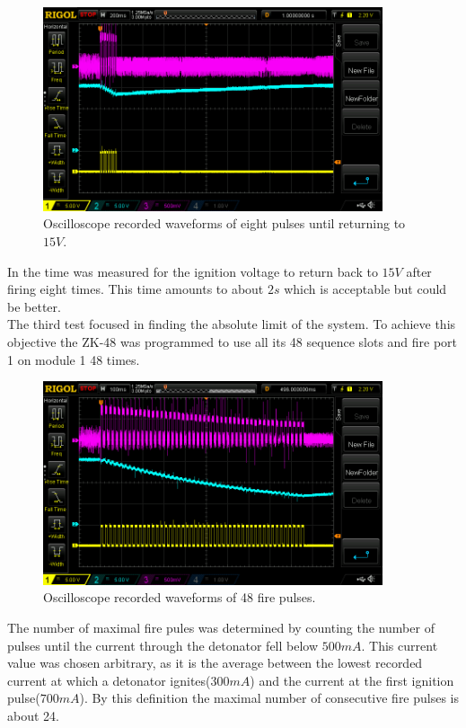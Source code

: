 \begin{figure}[!ht]
    \centering
    \includegraphics[width=10cm]{./Figures/eight_pulses_wide.png}
    \caption{Oscilloscope recorded waveforms of eight pulses until returning to $15V$.}
    \label{fig:eight_pulses_wide}     
\end{figure}

\noindent In  the time was measured for the ignition voltage to return back to $15V$ after firing eight times. This time amounts to about $2s$ which is acceptable but could be better.\\ 

\noindent The third test focused in finding the absolute limit of the system. To achieve this objective the ZK-48 was programmed to use all its 48 sequence slots and fire port 1 on module 1 48 times. 

\begin{figure}[!ht]
    \centering
    \includegraphics[width=10cm]{./Figures/max_pulses.png}
    \caption{Oscilloscope recorded waveforms of 48 fire pulses.}
    \label{fig:max_pulses}     
\end{figure}

\noindent The number of maximal fire pules was determined by counting the number of pulses until the current through the detonator fell below $500mA$. This current value was chosen arbitrary, as it is the average between the lowest recorded current at which a detonator ignites($300mA$) and the current at the first ignition pulse($700mA$). By this definition the maximal number of consecutive fire pulses is about 24.

